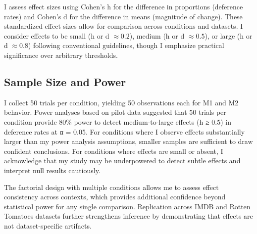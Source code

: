 I assess effect sizes using Cohen's h for the difference in proportions (deference rates) and Cohen's d for the difference in means (magnitude of change). These standardized effect sizes allow for comparison across conditions and datasets. I consider effects to be small (h or d $\approx 0.2$), medium (h or d $\approx 0.5$), or large (h or d $\approx 0.8$) following conventional guidelines, though I emphasize practical significance over arbitrary thresholds.

\subsection{Sample Size and Power}

I collect 50 trials per condition, yielding 50 observations each for M1 and M2 behavior. Power analyses based on pilot data suggested that 50 trials per condition provide 80\% power to detect medium-to-large effects (h ≥ 0.5) in deference rates at α = 0.05. For conditions where I observe effects substantially larger than my power analysis assumptions, smaller samples are sufficient to draw confident conclusions. For conditions where effects are small or absent, I acknowledge that my study may be underpowered to detect subtle effects and interpret null results cautiously.

The factorial design with multiple conditions allows me to assess effect consistency across contexts, which provides additional confidence beyond statistical power for any single comparison. Replication across IMDB and Rotten Tomatoes datasets further strengthens inference by demonstrating that effects are not dataset-specific artifacts.